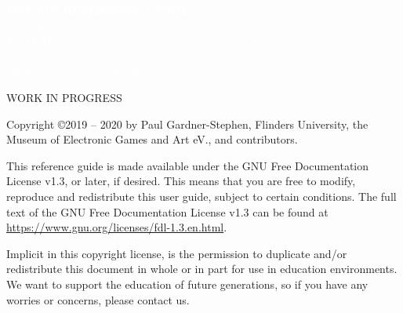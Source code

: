 





\cleardoublepage


  \begin{titlepage}
    \pagecolor{blue}
     \begin{center}
       {
         \large
         \vspace*{2cm}
               {\Huge\textcolor{white}{\bf{MEGA65 REFERENCE GUIDE}}}\\
             \vspace{\fill}
                    {\textcolor{white}
                    {Published by \\ the MEGA Museum of Electronic Games
                    and Art, Germany.\\and\\Flinders University, Australia.}}
       }
     \end{center}
   \end{titlepage}

  \pagecolor{white}\textcolor{black}
  \vfill
  WORK IN PROGRESS

  Copyright \copyright 2019 -- 2020 by Paul Gardner-Stephen,
  Flinders University, the Museum of Electronic Games and Art eV.,
  and contributors.

  This reference guide is made available under the GNU Free Documentation
  License v1.3, or later, if desired. This means that you are free to
  modify, reproduce and redistribute this user guide, subject to
  certain conditions. The full text of the GNU Free Documentation
  License v1.3 can be found at
  \url{https://www.gnu.org/licenses/fdl-1.3.en.html}.

  Implicit in this copyright license, is the permission to duplicate
  and/or redistribute this document in whole or in part for use in
  education environments. We want to support the education of future
  generations, so if you have any worries or concerns, please contact us.

